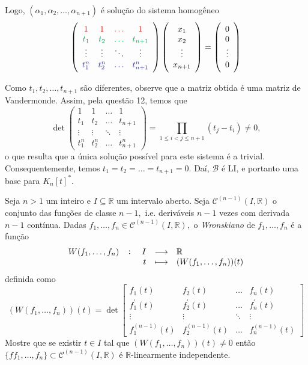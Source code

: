 \documentclass[11pt,a4paper]{article}
\begin{document}
{{    Logo, $(\alpha_1, \alpha_2, \ldots, \alpha_{n+1})$ é solução do sistema homogêneo
    \[
    \left( \begin{array}{cccc} \textcolor{red}{1} & \textcolor{red}{1} & \textcolor{red}{\ldots} & \textcolor{red}{1} \\ \textcolor{Green}{t_1} & \textcolor{Green}{t_2} & \textcolor{Green}{\ldots} & \textcolor{Green}{t_{n+1}} \\ \vdots & \vdots & \ddots & \vdots \\ \textcolor{Blue}{t_1^n} & \textcolor{Blue}{t_2^n} & \textcolor{Blue}{\ldots} & \textcolor{Blue}{t_{n+1}^n} \end{array}\right)\left( \begin{array}{c} x_1 \\ x_2 \\ \vdots \\ x_{n+1} \end{array}\right) =  \left( \begin{array}{c} 0\\ 0 \\ \vdots \\ 0 \end{array}\right)
    \]
    
   Como $t_1, t_2, \ldots, t_{n+1}$ são diferentes, observe que a matriz obtida é uma matriz de Vandermonde. Assim, pela questão 12, temos que \[\det \left( \begin{array}{cccc} 1 & 1 & \ldots & 1 \\ t_1 & t_2 & \ldots & t_{n+1} \\ \vdots & \vdots & \ddots & \vdots \\ t_1^n & t_2^n & \ldots & t_{n+1}^n \end{array}\right) = \prod\limits_{1 \le i < j \le n+1} (t_j - t_i) \neq 0,  \] o que resulta que a única solução possível para este sistema é a trivial. Consequentemente, temos $t_1 = t_2 = \ldots = t_{n+1} =0.$ Daí, $\mathcal{B}$ é LI, e portanto uma base para $K_n[t]^{*}.$
    }

}

 Seja $n > 1$ um inteiro e $I \subseteq \mathbb{R}$ um intervalo aberto. Seja $\mathcal{C}^{(n-1)}(I, \mathbb{R})$ o conjunto das funções de classe $n - 1,$ i.e. deriváveis $n - 1$ vezes com derivada $n - 1$ contínua. Dadas $f_1,\ldots, f_n \in \mathcal{C}^{(n-1)}(I, \mathbb{R}),$ o \emph{Wronskiano} de $f_1,\ldots, f_n $ é a função
\[
\fullfunction{W(f_1,\ldots, f_n)}{I}{\mathbb{R}}{t}{(W(f_1,\ldots, f_n))(t)}\]
definida como
\[
(W(f_1,\ldots, f_n))(t) = \det \left[ \begin{array}{cccc} f_1(t) & f_2(t) & \ldots & f_n(t) \\ f_1^{\prime}(t) & f_2^{\prime}(t) & \ldots & f_n^{\prime}(t) \\ \vdots & \vdots & \ddots & \vdots \\ f_1^{(n-1)}(t) & f_2^{(n-1)}(t)  & \ldots & f_n^{(n-1)}(t)  \end{array} \right]
\]
Mostre que se existir $t \in I$ tal que $(W(f_1,\ldots, f_n))(t) \neq 0$ então $\{ ff_1,\ldots, f_n \} \subset \mathcal{C}^{(n-1)}(I, \mathbb{R})$ é $\mathbb{R}$-linearmente independente.
\end{document}

